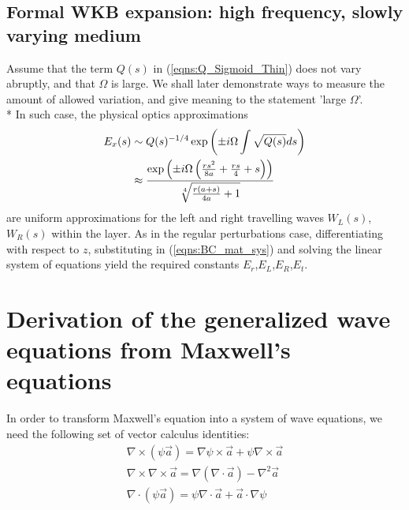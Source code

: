 \documentclass[twocolumn,secnumarabic,amssymb, nobibnotes, aps, prd]{revtex4-1}
\begin{document}
\subsection{Formal WKB expansion: high frequency, slowly varying medium}
Assume that the term $Q(s)$ in (\ref{eqns:Q_Sigmoid_Thin}) does not vary abruptly, and that $\Omega$ is large. We shall later demonstrate ways to measure the amount of allowed variation, and give meaning to the statement 'large $\Omega$'. \\*
In such case, the physical optics approximations 
\begin{align}
E_x(s) &\sim Q(s)^{-1/4}\exp \left( \pm i \Omega \int \sqrt{Q(s)}ds\right) \notag \\
& \approx \dfrac{\exp \left(\pm i \Omega  \left(\frac{r s^2}{8 a}+\frac{r s}{4}+s\right) \right)}{\sqrt[4]{\frac{r (a+s)}{4 a}+1}}
\end{align}
are uniform approximations for the left and right travelling waves $W_L(s)$, $W_R(s)$ within the layer. As in the regular perturbations case, differentiating with respect to $z$, substituting in (\ref{eqns:BC_mat_sys}) and solving the linear system of equations yield the required constants $E_r$,$E_L$,$E_R$,$E_t$. 

\newpage

  

\appendix
\section{Derivation of the generalized wave equations from Maxwell's equations}
\label{append:GeneralizedWaveDeriv}
In order to transform Maxwell's equation into a system of wave equations, we need the following set of vector calculus identities:
\begin{subequations}
\label{eqns:vectorCalcIDs}
	\begin{align}
			\nabla \times (\psi \overrightarrow{a}) = \nabla \psi \times 	
			\overrightarrow{a} + \psi \nabla \times \overrightarrow{a}  \label{eqns:ProdCurlID}\\
		\nabla \times \nabla \times \overrightarrow{a} = \nabla ( \nabla
			 \cdot \overrightarrow{a} ) - \nabla^2\overrightarrow{a} \label{eqns:CurlCurlID}\\
		\nabla \cdot (\psi \overrightarrow{a}) = \psi \nabla \cdot \overrightarrow{a}
			 + \overrightarrow{a} \cdot \nabla \psi \label{eqns:DivProdID}
			\end{align}
\end{subequations}
\end{document}
